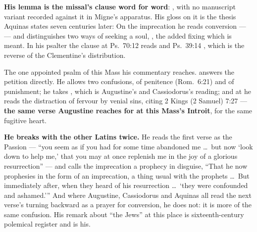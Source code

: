\begin{witnessnote}
\textbf{His lemma is the missal's clause word for word}: , with no manuscript
variant recorded against it in Migne's apparatus. His gloss on it is the thesis
Aquinas states seven centuries later:  On the imprecation he reads conversion ---  --- and distinguishes two ways of seeking a soul, , the added  fixing which is
meant. In his psalter the clause at Ps.~70:12 reads  and Ps.~39:14 , which is the reverse of
the Clementine's distribution.
\end{witnessnote}

\begin{witnessnote}
 The
one appointed psalm of this Mass his commentary reaches.  answers the petition directly. He allows two confusions,
of penitence (Rom.~6:21) and of punishment; he takes  , which is
Augustine's and Cassiodorus's reading; and at  he
reads the distraction of fervour by venial sins, citing 2 Kings (2 Samuel) 7:27
--- \textbf{the same verse Augustine reaches for at this Mass's Introit}, for the
same fugitive heart.
\end{witnessnote}

\begin{witnessnote}
\textbf{He breaks with the other Latins twice.} He reads the first verse as the
Passion --- ``you seem as if you had for some time abandoned me \dots\ but now
`look down to help me,' that you may at once replenish me in the joy of a
glorious resurrection'' --- and calls the imprecation a prophecy in disguise,
``That he now prophesies in the form of an imprecation, a thing usual with the
prophets \dots\ But immediately after, when they heard of his resurrection \dots\
`they were confounded and ashamed.''' And where Augustine, Cassiodorus and
Aquinas all read the next verse's turning backward as a prayer for conversion, he
does not: it is more of the same confusion. His remark about ``the Jews'' at this
place is sixteenth-century polemical register and is his.
\end{witnessnote}

